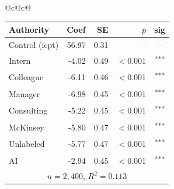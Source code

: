 \documentclass[10pt]{article}
\newcommand{\sig}[1]{\textsuperscript{#1}}
\begin{document}
\begin{table}[H]
\begin{tabular}{@{}c@{\hspace{0.5em}}c@{}}
\begin{minipage}[t]{0.49\textwidth}
\begin{tabular}{@{}l r r r c@{}}
\toprule
Authority & Coef & SE & $p$ & sig \\
\midrule
\cellcolor{gray!22}Control (icpt) & \cellcolor{gray!22}56.97 & \cellcolor{gray!22}0.31 & \cellcolor{gray!22}-- & \cellcolor{gray!22}-- \\
\midrule
Intern & -4.02 & 0.49 & $<$0.001 & \sig{***} \\
Colleague & -6.11 & 0.46 & $<$0.001 & \sig{***} \\
Manager & -6.98 & 0.45 & $<$0.001 & \sig{***} \\
\midrule
Consulting & -5.22 & 0.45 & $<$0.001 & \sig{***} \\
McKinsey & -5.80 & 0.47 & $<$0.001 & \sig{***} \\
\midrule
Unlabeled & -5.77 & 0.47 & $<$0.001 & \sig{***} \\
AI & -2.94 & 0.45 & $<$0.001 & \sig{***} \\
\midrule
\multicolumn{5}{c}{\scriptsize $n=2{,}400$, $R^2=0.113$} \\
\bottomrule\end{tabular}
\end{minipage} \\
\end{tabular}
\end{table}
\end{document}
